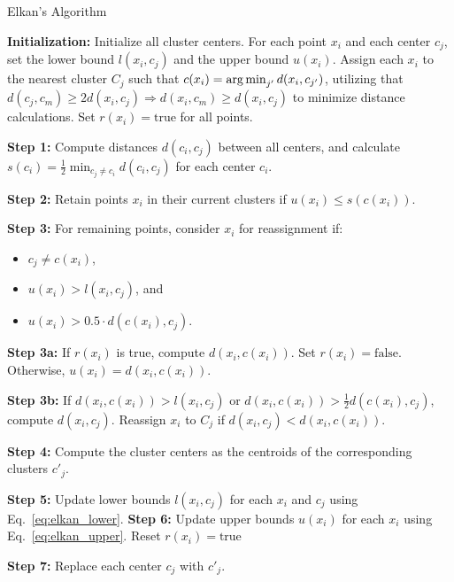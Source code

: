\begin{algorithm}[h]
	\caption{Elkan's Algorithm}
	\label{alg:elkan}
	\begin{algorithmic}
		\State \textbf{Initialization:} Initialize all cluster centers. For each point $x_i$ and each center $c_j$, set the lower bound $l(x_i,c_j)$ and the upper bound $u(x_i)$. Assign each $x_i$ to the nearest cluster $C_j$ such that $c(x_i) = \operatorname*{arg\,min}_{j'} d(x_i, c_{j'})$, utilizing that
		$ d(c_j, c_m) \geq 2d(x_i, c_j) \Rightarrow d(x_i, c_m) \geq d(x_i, c_j) $
		to minimize distance calculations. Set $r(x_i) = \text{true}$ for all points.

		\Repeat
		\State \textbf{Step 1:} Compute distances $d(c_i, c_j)$ between all centers, and calculate $s(c_i) = \frac{1}{2} \min_{c_j \neq c_i} d(c_i, c_j)$ for each center $c_i$.

		\State \textbf{Step 2:} Retain points $x_i$ in their current clusters if $u(x_i) \leq s(c(x_i))$.

		\State \textbf{Step 3:} For remaining points, consider $x_i$ for reassignment if:
		\begin{itemize}[leftmargin=5em,itemindent=\algorithmicindent,itemsep=0pt,parsep=0pt]
			\item $c_j \neq c(x_i)$,
			\item $u(x_i) > l(x_i, c_j)$, and
			\item $u(x_i) > 0.5 \cdot d(c(x_i), c_j)$.
		\end{itemize}

		\State \textbf{Step 3a:} If $r(x_i)$ is true, compute $d(x_i, c(x_i))$. Set $r(x_i) = \text{false}$. Otherwise, $u(x_i) = d(x_i, c(x_i))$.

		\State \textbf{Step 3b:} If $d(x_i, c(x_i)) > l(x_i, c_j)$ or $d(x_i, c(x_i)) > \frac{1}{2}d(c(x_i), c_j)$, compute $d(x_i, c_j)$. Reassign $x_i$ to $C_j$ if $d(x_i, c_j) < d(x_i, c(x_i))$.

		\State \textbf{Step 4:} Compute the cluster centers as the centroids of the corresponding clusters $c'_j$.

		\State \textbf{Step 5:} Update lower bounds $l(x_i, c_j)$ for each $x_i$ and $c_j$ using Eq.~\ref{eq:elkan_lower}.
		\State \textbf{Step 6:} Update upper bounds $u(x_i)$ for each $x_i$ using Eq.~\ref{eq:elkan_upper}. Reset $r(x_i) = \text{true}$

		\State \textbf{Step 7:} Replace each center $c_j$ with $c'_j$.
	\end{algorithmic}
\end{algorithm}

